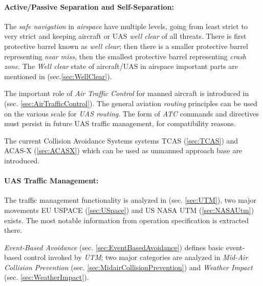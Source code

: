 \paragraph{Active/Passive Separation and Self-Separation:} The \emph{safe navigation} in \emph{airspace} have multiple levels, going from least strict to very strict and keeping aircraft or UAS \emph{well clear} of all threats. There is first protective barrel known as \emph{well clear}; then there is a smaller protective barrel representing \emph{near miss}, then the smallest protective barrel representing \emph{crash zone}. The \emph{Well clear} state of aircraft/UAS in airspace  important parts are mentioned in (sec.\ref{sec:WellClear}). 

The important role of \emph{Air Traffic Control} for manned aircraft is introduced in  (sec. \ref{sec:AirTrafficControl}). The general aviation \emph{routing} principles can be used on the various scale for \emph{UAS routing}. The form of \emph{ATC} commands and directives must persist in future UAS traffic management, for compatibility reasons.

The current Collision Avoidance Systems systems TCAS (\ref{sec:TCAS}) and ACAS-X (\ref{sec:ACASX}) which can be used as unmanned approach base are introduced.

\paragraph{UAS Traffic Management:} The traffic management functionality is analyzed in (sec. \ref{sec:UTM}), two major movements EU USPACE (\ref{sec:USpace}) and US NASA UTM (\ref{sec:NASAUtm}) exists. The most notable information from operation specification is extracted there.

\emph{Event-Based Avoidance} (sec. \ref{sec:EventBasedAvoidance}) defines basic event-based control invoked by \emph{UTM}; two major categories are analyzed in \emph{Mid-Air Collision Prevention} (sec. \ref{sec:MidairCollisionPrevention}) and \emph{Weather Impact} (sec. \ref{sec:WeatherImpact}).